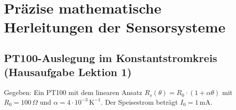 \documentclass[11pt,a4paper]{article}
\begin{document}
\newpage

\section{Präzise mathematische Herleitungen der Sensorsysteme}

\subsection{PT100-Auslegung im Konstantstromkreis (Hausaufgabe Lektion 1)}
Gegeben: Ein PT100 mit dem linearen Ansatz $R_s(\theta) = R_0 \cdot (1 + \alpha\theta)$ mit $R_0 = 100\,\Omega$ und $\alpha = 4 \cdot 10^{-3}\,\text{K}^{-1}$. Der Speisestrom beträgt $I_0 = 1\,\text{mA}$.
\end{document}
